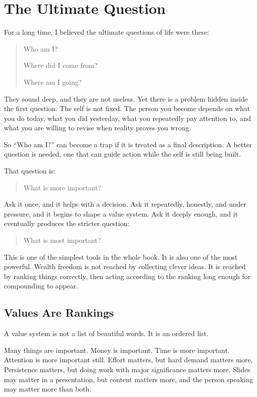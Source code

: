 \chapter{The Ultimate Question}

For a long time, I believed the ultimate questions of life were these:

\begin{quote}
Who am I?

Where did I come from?

Where am I going?
\end{quote}

They sound deep, and they are not useless. Yet there is a problem hidden inside the first question. The self is not fixed. The person you become depends on what you do today, what you did yesterday, what you repeatedly pay attention to, and what you are willing to revise when reality proves you wrong.

So ``Who am I?'' can become a trap if it is treated as a final description. A better question is needed, one that can guide action while the self is still being built.

That question is:

\begin{quote}
What is more important?
\end{quote}

Ask it once, and it helps with a decision. Ask it repeatedly, honestly, and under pressure, and it begins to shape a value system. Ask it deeply enough, and it eventually produces the stricter question:

\begin{quote}
What is most important?
\end{quote}

This is one of the simplest tools in the whole book. It is also one of the most powerful. Wealth freedom is not reached by collecting clever ideas. It is reached by ranking things correctly, then acting according to the ranking long enough for compounding to appear.

\section*{Values Are Rankings}

A value system is not a list of beautiful words. It is an ordered list.

Many things are important. Money is important. Time is more important. Attention is more important still. Effort matters, but hard demand matters more. Persistence matters, but doing work with major significance matters more. Slides may matter in a presentation, but content matters more, and the person speaking may matter more than both.

